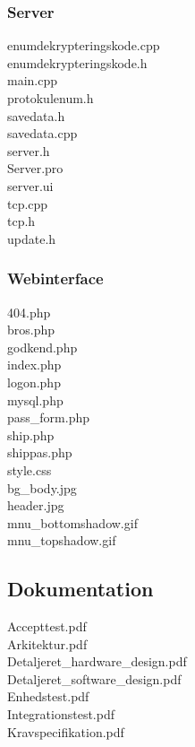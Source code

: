 \subsubsection*{Server}
enumdekrypteringskode.cpp\\
enumdekrypteringskode.h\\
main.cpp\\
protokulenum.h\\
savedata.h\\
savedata.cpp\\
server.h\\
Server.pro\\
server.ui\\
tcp.cpp\\
tcp.h\\
update.h\\
\subsubsection*{Webinterface}
404.php\\
bros.php\\
godkend.php\\
index.php\\
logon.php\\
mysql.php\\
pass\_form.php\\
ship.php\\
shippas.php\\
style.css\\
bg\_body.jpg\\
header.jpg\\
mnu\_bottomshadow.gif\\
mnu\_topshadow.gif\\


\subsection{Dokumentation}
Accepttest.pdf\\
Arkitektur.pdf\\
Detaljeret\_hardware\_design.pdf\\
Detaljeret\_software\_design.pdf\\
Enhedstest.pdf\\
Integrationstest.pdf\\
Kravspecifikation.pdf\\

